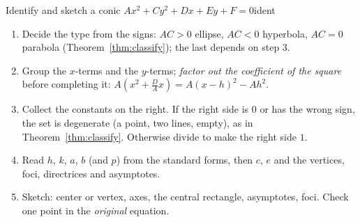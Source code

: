 \documentclass[11pt]{article}
\begin{document}
\begin{proc}{Identify and sketch a conic $Ax^2+Cy^2+Dx+Ey+F=0$}{ident}
\begin{enumerate}[nosep]
  \item Decide the type from the signs: $AC>0$ ellipse, $AC<0$ hyperbola, $AC=0$ parabola (Theorem~\ref{thm:classify}); the last depends on step 3.
  \item Group the $x$-terms and the $y$-terms; \emph{factor out the coefficient of the square} before completing it: $A\left(x^2+\frac DAx\right)=A(x-h)^2-Ah^2$.
  \item Collect the constants on the right. If the right side is $0$ or has the wrong sign, the set is degenerate (a point, two lines, empty), as in Theorem~\ref{thm:classify}. Otherwise divide to make the right side $1$.
  \item Read $h$, $k$, $a$, $b$ (and $p$) from the standard forms, then $c$, $e$ and the vertices, foci, directrices and asymptotes.
  \item Sketch: center or vertex, axes, the central rectangle, asymptotes, foci. Check one point in the \emph{original} equation.
\end{enumerate}
\end{proc}
\end{document}
